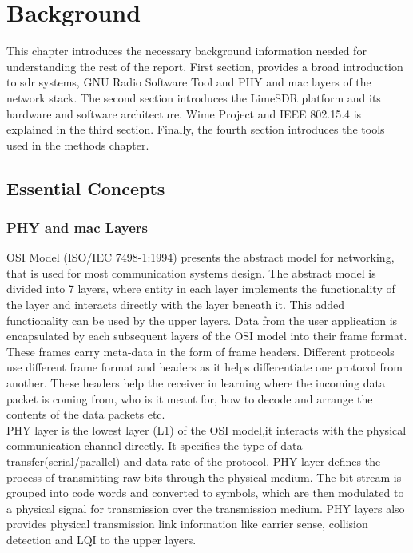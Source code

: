 \chapter{Background}
This chapter introduces the necessary background information needed for understanding the rest of the report.
First section, provides a broad introduction to \ac{sdr} systems, GNU Radio Software Tool and \ac{PHY} and \ac{mac} layers of the network stack.
The second section introduces the LimeSDR platform and its hardware and software architecture.
Wime Project and IEEE 802.15.4 is explained in the third section.
Finally, the fourth section introduces the tools used in the methods chapter.


\section{Essential Concepts}
\subsection{\ac{PHY} and \ac{mac} Layers}
\ac{OSI} Model (ISO/IEC 7498-1:1994) presents the abstract model for networking, that is used for most communication systems design.
The abstract model is divided into 7 layers,  where entity in each layer implements the functionality of the layer and interacts directly with the layer beneath it.
This added functionality can be used by the upper layers.
Data from the user application is encapsulated by each subsequent layers of the \ac{OSI} model into their frame format.
These frames carry meta-data in the form of frame headers.
Different protocols use different frame format and headers  as it helps differentiate one protocol from another.
These headers help the receiver in learning where the incoming data packet is coming from, who is it meant for, how to decode and arrange the contents of the data packets etc.\\

\ac{PHY} layer is the lowest layer (L1) of the \ac{OSI} model,it interacts with the physical communication channel directly.
It specifies the type of data transfer(serial/parallel) and data rate of the protocol.
\ac{PHY} layer defines the process of transmitting raw bits through the physical medium.
The bit-stream is grouped into code words and converted to symbols, which are then modulated to a physical signal for transmission over the transmission medium.
\ac{PHY} layers also provides physical transmission link information like carrier sense, collision detection and \ac{LQI}  to the upper layers. \\


